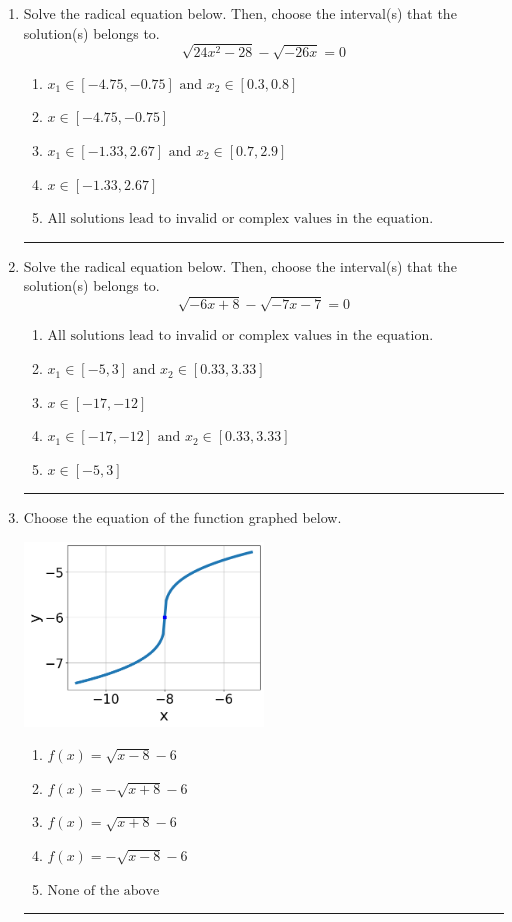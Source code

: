 \documentclass[14pt]{extbook}
\newcommand{\litem}[1]{\item#1\hspace*{-1cm}\rule{\textwidth}{0.4pt}}
\begin{document}
\begin{enumerate}
{\begin{enumerate}[label=\Alph*.]
\end{enumerate} }
\litem{
Solve the radical equation below. Then, choose the interval(s) that the solution(s) belongs to.\[ \sqrt{24 x^2 - 28} - \sqrt{-26 x} = 0 \]\begin{enumerate}[label=\Alph*.]
\item \( x_1 \in [-4.75, -0.75] \text{ and } x_2 \in [0.3,0.8] \)
\item \( x \in [-4.75,-0.75] \)
\item \( x_1 \in [-1.33, 2.67] \text{ and } x_2 \in [0.7,2.9] \)
\item \( x \in [-1.33,2.67] \)
\item \( \text{All solutions lead to invalid or complex values in the equation.} \)

\end{enumerate} }
\litem{
Solve the radical equation below. Then, choose the interval(s) that the solution(s) belongs to.\[ \sqrt{-6 x + 8} - \sqrt{-7 x - 7} = 0 \]\begin{enumerate}[label=\Alph*.]
\item \( \text{All solutions lead to invalid or complex values in the equation.} \)
\item \( x_1 \in [-5, 3] \text{ and } x_2 \in [0.33,3.33] \)
\item \( x \in [-17,-12] \)
\item \( x_1 \in [-17, -12] \text{ and } x_2 \in [0.33,3.33] \)
\item \( x \in [-5,3] \)

\end{enumerate} }
\litem{
Choose the equation of the function graphed below.
\begin{center}
    \includegraphics[width=0.5\textwidth]{../Figures/radicalGraphToEquationB.png}
\end{center}
\begin{enumerate}[label=\Alph*.]
\item \( f(x) = \sqrt{x - 8} - 6 \)
\item \( f(x) = - \sqrt{x + 8} - 6 \)
\item \( f(x) = \sqrt{x + 8} - 6 \)
\item \( f(x) = - \sqrt{x - 8} - 6 \)
\item \( \text{None of the above} \)

\end{enumerate} }
\end{enumerate}
\end{document}
